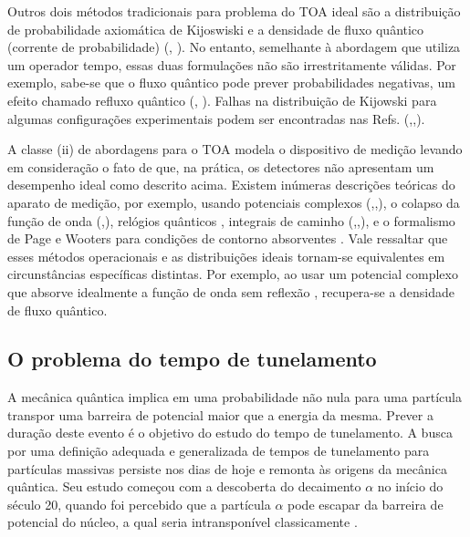Outros dois métodos tradicionais para problema do TOA ideal são a distribuição de probabilidade axiomática de Kijoswiski \cite{7} e a densidade de fluxo quântico (corrente de probabilidade) (\cite{8}, \cite{Das2}). No entanto, semelhante à abordagem que utiliza um operador tempo, essas duas formulações não são irrestritamente válidas. Por exemplo, sabe-se que o fluxo quântico pode prever probabilidades negativas, um efeito chamado refluxo quântico (\cite{Das}, \cite{9}). Falhas na distribuição de Kijowski para algumas configurações experimentais podem ser encontradas nas Refs. (\cite{when},\cite{13},\cite{14}). 

A classe (ii) de abordagens para o TOA modela o dispositivo de medição levando em consideração o fato de que, na prática, os detectores não apresentam um desempenho ideal como descrito acima. Existem inúmeras descrições teóricas do aparato de medição, por exemplo, usando potenciais complexos (\cite{MugaComplex},\cite{14},\cite{18}), o colapso da função de onda (\cite{18},\cite{20}), relógios quânticos \cite{Damborenea}, integrais de caminho (\cite{Schuss},\cite{Schuss2},\cite{Schuss3}), e o formalismo de Page e Wooters para condições de contorno absorventes \cite{pagewootters}. Vale ressaltar que esses métodos operacionais e as distribuições ideais tornam-se equivalentes em circunstâncias específicas distintas. Por exemplo, ao usar um potencial complexo que absorve idealmente a função de onda sem reflexão \cite{MugaComplex}, recupera-se a densidade de fluxo quântico.

\subsection{O problema do tempo de tunelamento}
\label{tunelamento}

 A mecânica quântica implica em uma probabilidade não nula para uma partícula transpor uma barreira de potencial maior que a energia da mesma. Prever a duração deste evento é o objetivo do estudo do tempo de tunelamento. A busca por uma definição adequada e generalizada de tempos de tunelamento para partículas massivas persiste nos dias de hoje e remonta às origens da mecânica quântica. Seu estudo começou com a descoberta do decaimento $\alpha$ no início do século 20, quando foi percebido que a partícula $\alpha$ pode escapar da barreira de potencial do núcleo, a qual seria intransponível classicamente \cite{18}.

